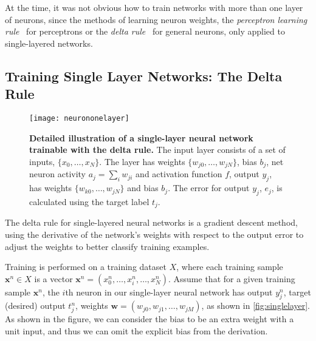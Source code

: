 \documentclass[thesis]{subfiles}
\begin{document}
At the time, it was not obvious how to train networks with more than one layer of neurons, since the methods of learning neuron weights, the \emph{perceptron learning rule}~\citep{rosenblatt1961principles} for perceptrons or the \emph{delta rule}~\citep{widrow1960adaptive} for general neurons, only applied to single-layered networks. %

\subsection{Training Single Layer Networks: The Delta Rule}
\label{deltarule}
\begin{figure}[tbp]
\centering
\texttt{[image: neurononelayer]}
\caption[Detailed illustration of a single-layer neural network]{\textbf{Detailed illustration of a single-layer neural network trainable with the delta rule.} The input layer consists of a set of inputs, $\{x_{0}, \ldots, x_{N}\}$. The layer has weights $\{w_{j0}, \ldots, w_{jN}\}$, bias $b_j$, net neuron activity $a_j = \sum_i w_{ji}$ and activation function $f$, output $y_j$, has weights $\{w_{k0}, \ldots, w_{jN}\}$ and bias $b_j$. The error for output $y_j$, $e_j$, is calculated using the target label $t_j$.}
\label{fig:neurononelayer}
\end{figure}

The delta rule for single-layered neural networks is a gradient descent method, using the derivative of the network's weights with respect to the output error to adjust the weights to better classify training examples.

Training is performed on a training dataset $X$, where each training sample $\mathbf{x}^n\in X$ is a vector $\mathbf{x}^n = (x^n_0, \ldots, x^n_i, \ldots, x^n_N)$. Assume that for a given training sample $\mathbf{x}^n$, the $i$th neuron in our single-layer neural network has output $y^n_j$, target (desired) output $t^n_j$, weights $\mathbf{w}=(w_{j0}, w_{j1}, \ldots, w_{jM})$, as shown in \cref{fig:singlelayer}. As shown in the figure, we can consider the bias to be an extra weight with a unit input, and thus we can omit the explicit bias from the derivation. 
\end{document}
